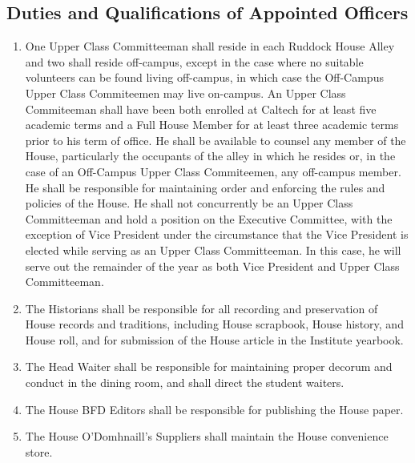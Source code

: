 \documentclass[10pt]{article} %
\begin{document}
\subsection{Duties and Qualifications of Appointed Officers}
\begin{enumerate}
\item One Upper Class Committeeman shall reside in each Ruddock House Alley and two shall reside off-campus, except in the case where no suitable volunteers can be found living off-campus, in which case the Off-Campus Upper Class Commiteemen may live on-campus. An Upper Class Commiteeman shall have been both enrolled at Caltech for at least five academic terms and a Full House Member for at least three academic terms prior to his term of office. He shall be available to counsel any member of the House, particularly the occupants of the alley in which he resides or, in the case of an Off-Campus Upper Class Commiteemen, any off-campus member. He shall be responsible for maintaining order and enforcing the rules and policies of the House. He shall not concurrently be an Upper Class Committeeman and hold a position on the Executive Committee, with the exception of Vice President under the circumstance that the Vice President is elected while serving as an Upper Class Committeeman. In this case, he will serve out the remainder of the year as both Vice President and Upper Class Committeeman.
\item The Historians shall be responsible for all recording and preservation of House records and traditions, including House scrapbook, House history, and House roll, and for submission of the House article in the Institute yearbook.
\item The Head Waiter shall be responsible for maintaining proper decorum and conduct in the dining room, and shall direct the student waiters.
\item The House BFD Editors shall be responsible for publishing the House paper.
\item The House O’Domhnaill’s Suppliers shall maintain the House convenience store.
\end{enumerate}
\end{document}
